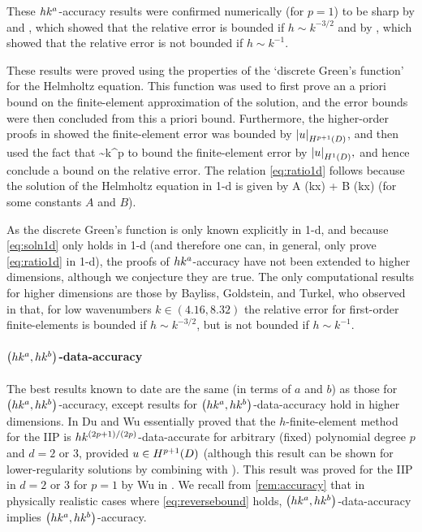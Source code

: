 These $hk^{a}$-accuracy results were confirmed numerically (for $p=1$) to be sharp by \cite[Figure 11]{IhBa:95a} and \cite[Figure 4.13]{Ih:98}, which showed that the relative error is bounded if $h \sim k^{-3/2}$ and by \cite[Figure 4.10]{Ih:98}, which showed that the relative error is not bounded if $h \sim k^{-1}.$

These results were proved using the properties of the `discrete Green's function' for the Helmholtz equation. This function was used to first prove an a priori bound on the finite-element approximation of the solution, and the error bounds were then concluded from this a priori bound. Furthermore, the higher-order proofs in \cite{IhBa:97,Ih:98} showed the finite-element error was bounded by $\SNHppoD{u}$, and then used the fact that
\beq\label{eq:ratio1d}
 \sim k^p
\eeq
to bound the finite-element error by $\SNHoD{u},$ and hence conclude a bound on the relative error. The relation \cref{eq:ratio1d} follows because the solution of the Helmholtz equation in 1-d is given by
\beq\label{eq:soln1d}
A \cos(kx) + B \sin(kx)
\eeq
(for some constants $A$ and $B$).

As the discrete Green's function is only known explicitly in 1-d, and because \cref{eq:soln1d} only holds in 1-d (and therefore one can, in general, only prove \cref{eq:ratio1d} in 1-d), the proofs of $hk^{a}$-accuracy have not been extended to higher dimensions, although we conjecture they are true.  The only computational results for higher dimensions are those by Bayliss, Goldstein, and Turkel, who observed in \cite[Section 3, Tables 1--3]{BaGoTu:85} that, for low wavenumbers $k \in (4.16,8.32)$ the relative error for first-order finite-elements is bounded if $h \sim k^{-3/2}$, but is not bounded if $h \sim k^{-1}.$

\paragraph{$\hk{a}b$-data-accuracy} The best results known to date are the same (in terms of $a$ and $b$) as those for $\hk{a}b$-accuracy, except results for $\hk{a}b$-data-accuracy hold in higher dimensions. In \cite[Theorem 5.1, Corollary 5.2]{DuWu:15} Du and Wu essentially proved that the $h$-finite-element method for the IIP is $hk^{(2p+1)/(2p)}$-data-accurate for arbitrary (fixed) polynomial degree $p$ and $d = 2$ or $3$, provided $u \in \HppoD$ (although this result can be shown for lower-regularity solutions by combining \cite[Theorem 5.1]{DuWu:15} with \cite[Lemma 3.5]{DuWu:15}). This result was proved for the IIP in $d = 2$ or $3$ for $p=1$ by Wu in \cite{Wu:14}. We recall from \cref{rem:accuracy} that in physically realistic cases where \cref{eq:reversebound} holds, $\hk{a}{b}$-data-accuracy implies $\hk{a}{b}$-accuracy.

